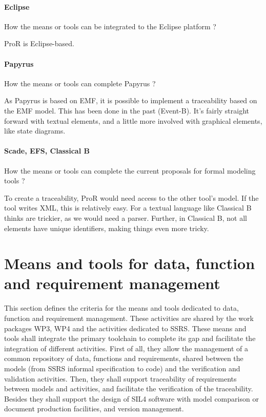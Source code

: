 \paragraph{Eclipse}
How the means or tools can be integrated to the Eclipse platform ?

\begin{author_comment}
ProR is Eclipse-based.
\end{author_comment}

\paragraph{Papyrus}
How the means or tools can complete  Papyrus ?

\begin{author_comment}
As Papyrus is based on EMF, it is possible to implement a traceability based on the EMF model.  This has been done in the past (Event-B).  It's fairly straight forward with textual elements, and a little more involved with graphical elements, like state diagrams.

\end{author_comment}

\paragraph{Scade, EFS, Classical B}
How the means or tools can complete the current proposals for formal modeling tools ?

\begin{author_comment}
To create a traceability, ProR would need access to the other tool's model.  If the tool writes XML, this is relatively easy.  For a textual language like Classical B thinks are trickier, as we would need a parser.  Further, in Classical B, not all elements have unique identifiers, making things even more tricky.
\end{author_comment}


\section{Means and tools for data, function and requirement management}
\label{sec:management}


This section defines the criteria for the means and tools dedicated to data, function and requirement management. These activities are shared by the work packages WP3, WP4 and the activities dedicated to  SSRS.
These means and tools shall integrate the primary toolchain to  complete its gap and facilitate the integration of different activities. First of all, they  allow the management of a common repository of data, functions and requirements, shared between the models (from SSRS informal specification to code) and the verification and validation activities.
Then, they shall support traceability of requirements between models and activities, and facilitate the verification of the traceability.
Besides they shall support the design of SIL4 software with model comparison or document production facilities, and version management.

